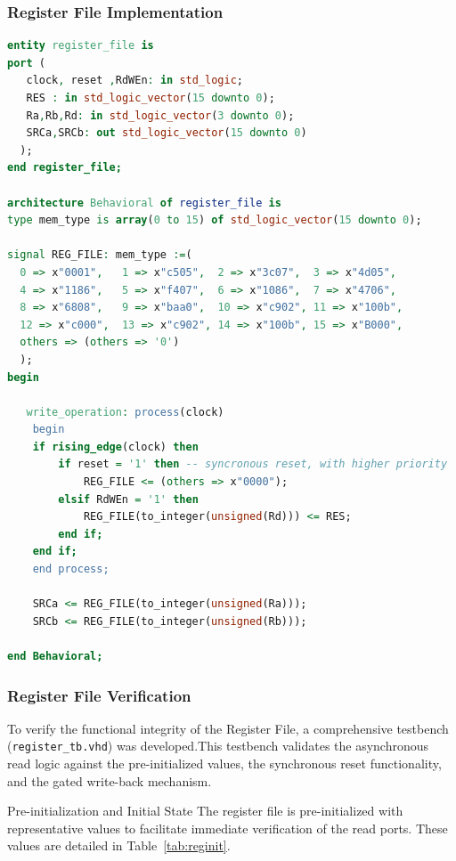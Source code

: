 \documentclass[12pt, a4paper]{report}
\begin{document}
\subsubsection{Register File Implementation}
\begin{lstlisting}[language=VHDL, 
                   caption={VHDL Implementation of the 16x16-bit Register File}, 
                   label={lst:reg_file}]
entity register_file is
port ( 
   clock, reset ,RdWEn: in std_logic;  
   RES : in std_logic_vector(15 downto 0); 
   Ra,Rb,Rd: in std_logic_vector(3 downto 0); 
   SRCa,SRCb: out std_logic_vector(15 downto 0) 
  );
end register_file;

architecture Behavioral of register_file is	
type mem_type is array(0 to 15) of std_logic_vector(15 downto 0);

signal REG_FILE: mem_type :=( 
  0 => x"0001",   1 => x"c505",  2 => x"3c07",  3 => x"4d05",
  4 => x"1186",   5 => x"f407",  6 => x"1086",  7 => x"4706",
  8 => x"6808",   9 => x"baa0",  10 => x"c902", 11 => x"100b",
  12 => x"c000",  13 => x"c902", 14 => x"100b", 15 => x"B000",
  others => (others => '0')
  );
begin	   
	
   write_operation: process(clock)
	begin
    if rising_edge(clock) then
        if reset = '1' then	-- syncronous reset, with higher priority
            REG_FILE <= (others => x"0000");
        elsif RdWEn = '1' then
            REG_FILE(to_integer(unsigned(Rd))) <= RES;
        end if;
    end if;
	end process;

	SRCa <= REG_FILE(to_integer(unsigned(Ra)));	
	SRCb <= REG_FILE(to_integer(unsigned(Rb)));
   
end Behavioral;                   
\end{lstlisting}


\subsubsection{Register File Verification}
To verify the functional integrity of the Register File, a comprehensive testbench (\texttt{register\_tb.vhd}) was developed.This testbench validates the asynchronous read logic against the pre-initialized values, the synchronous reset functionality, and the gated write-back mechanism.

Pre-initialization and Initial State
The register file is pre-initialized with representative values to facilitate immediate verification of the read ports. These values are detailed in Table~\ref{tab:reginit}.
\end{document}
